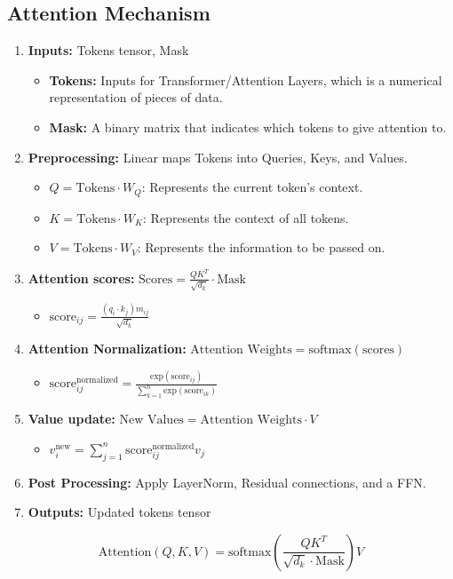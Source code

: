 \subsection{Attention Mechanism}
\begin{process}
    \begin{enumerate}
        \item \textbf{Inputs:} Tokens tensor, Mask
        \begin{itemize}
            \item \textbf{Tokens:} Inputs for Transformer/Attention Layers, which is a numerical representation of pieces of data.
            \item \textbf{Mask:} A binary matrix that indicates which tokens to give attention to.
        \end{itemize}
        \item \textbf{Preprocessing:} Linear maps Tokens into Queries, Keys, and Values.
        \begin{itemize}
            \item $Q = \text{Tokens} \cdot W_Q$: Represents the current token's context.
            \item $K = \text{Tokens} \cdot W_K$: Represents the context of all tokens.
            \item $V = \text{Tokens} \cdot W_V$: Represents the information to be passed on.
        \end{itemize}
        \item \textbf{Attention scores:} $\text{Scores} = \frac{QK^T}{\sqrt{d_k}} \cdot \text{Mask}$
        \begin{itemize}
            \item $\text{score}_{ij} = \frac{(q_i \cdot k_j) m_{ij}}{\sqrt{d_k}}$
        \end{itemize}
        \item \textbf{Attention Normalization:} $\text{Attention Weights} = \text{softmax}(\text{scores})$
        \begin{itemize}
            \item $\text{score}_{ij}^{\text{normalized}} = \frac{\text{exp}(\text{score}_{ij})}{\sum_{k=1}^n \text{exp}{(\text{score}_{ik})}}$
        \end{itemize}
        \item \textbf{Value update:} $\text{New Values} = \text{Attention Weights} \cdot V$
        \begin{itemize}
            \item $v_i^{\text{new}} = \sum_{j=1}^n \text{score}_{ij}^{\text{normalized}} v_j$
        \end{itemize}
        \item \textbf{Post Processing:} Apply LayerNorm, Residual connections, and a FFN.
        \item \textbf{Outputs:} Updated tokens tensor
    \end{enumerate}
    \begin{equation}
        \text{Attention}(Q, K, V) = \text{softmax}\left(\frac{QK^T}{\sqrt{d_k}\cdot \text{Mask}}\right)V
    \end{equation}

\end{process}

